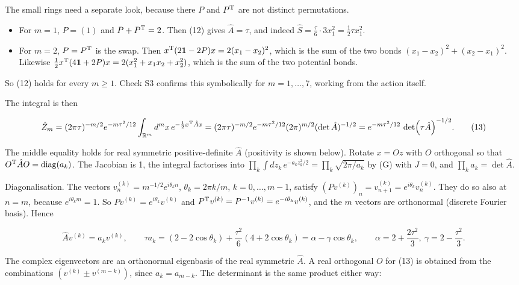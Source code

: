 \documentclass[11pt,a4paper]{article}
\newcommand{\tagmark}[1]{\marginnote{\scriptsize\ttfamily #1}}
\newcommand{\Dtag}{\tagmark{[D]}}   %
\providecommand{\tightlist}{\setlength{\itemsep}{0pt}\setlength{\parskip}{0pt}}
\begin{document}
The small rings need a separate look, because there \(P\) and
\(P^{\rm T}\) are not distinct permutations.

\begin{itemize}
\tightlist
\item
  For \(m=1\), \(P = (1)\) and \(P+P^{\rm T} = 2\). Then (12) gives
  \(\hat A = \tau\), and indeed
  \(\hat S = \tfrac\tau6\cdot3x_1^2 = \tfrac12\tau x_1^2\).
\item
  For \(m=2\), \(P = P^{\rm T}\) is the swap. Then
  \(x^{\rm T}(2\mathbf 1 - 2P)x = 2(x_1-x_2)^2\), which is the sum of
  the two bonds \((x_1-x_2)^2 + (x_2-x_1)^2\). Likewise
  \(\tfrac12x^{\rm T}(4\mathbf 1+2P)x = 2(x_1^2+x_1x_2+x_2^2)\), which
  is the sum of the two potential bonds.
\end{itemize}

So (12) holds for every \(m\ge1\). Check S3 confirms this symbolically
for \(m=1,\dots,7\), working from the action itself.

The integral is then

\[
\hat Z_m = (2\pi\tau)^{-m/2}e^{-m\tau^2/12}\int_{\mathbb R^m}d^mx\,e^{-\frac12x^{\rm T}\hat Ax} = (2\pi\tau)^{-m/2}e^{-m\tau^2/12}(2\pi)^{m/2}(\det\hat A)^{-1/2} = e^{-m\tau^2/12}\,\det(\tau\hat A)^{-1/2}. \tag{13}
\]

\Dtag{} The middle equality holds for real symmetric positive-definite
\(\hat A\) (positivity is shown below). Rotate \(x = Oz\) with \(O\)
orthogonal so that \(O^{\rm T}\hat AO = {\rm diag}(a_k)\). The Jacobian
is 1, the integral factorises into
\(\prod_k\int dz_k\,e^{-a_kz_k^2/2} = \prod_k\sqrt{2\pi/a_k}\) by (G)
with \(J=0\), and \(\prod_ka_k = \det\hat A\).

Diagonalisation. The vectors \(v^{(k)}_n = m^{-1/2}e^{i\theta_kn}\),
\(\theta_k = 2\pi k/m\), \(k=0,\dots,m-1\), satisfy
\((Pv^{(k)})_n = v^{(k)}_{n+1} = e^{i\theta_k}v^{(k)}_n\). They do so
also at \(n=m\), because \(e^{i\theta_k m} = 1\). So
\(Pv^{(k)} = e^{i\theta_k}v^{(k)}\) and
\(P^{\rm T}v^{(k)} = P^{-1}v^{(k)} = e^{-i\theta_k}v^{(k)}\), and the
\(m\) vectors are orthonormal (discrete Fourier basis). Hence

\[
\hat Av^{(k)} = a_kv^{(k)},\qquad \tau a_k = (2-2\cos\theta_k) + \frac{\tau^2}{6}(4 + 2\cos\theta_k) = \alpha - \gamma\cos\theta_k,\qquad \alpha = 2 + \frac{2\tau^2}{3},\ \gamma = 2 - \frac{\tau^2}{3}. \tag{14}
\]

The complex eigenvectors are an orthonormal eigenbasis of the real
symmetric \(\hat A\). A real orthogonal \(O\) for (13) is obtained from
the combinations \((v^{(k)} \pm v^{(m-k)})\), since \(a_k = a_{m-k}\).
The determinant is the same product either way:
\end{document}
